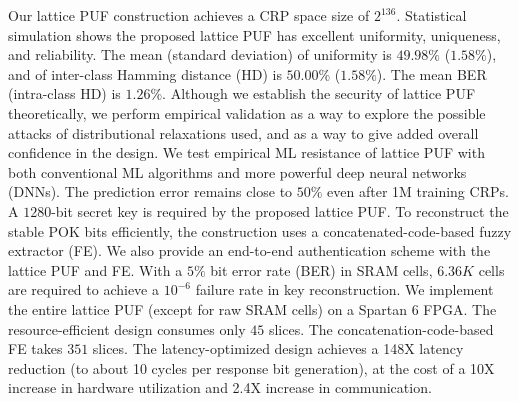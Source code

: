 Our lattice PUF construction achieves a CRP space size of $2^{136}$.
Statistical simulation shows the proposed lattice PUF has excellent uniformity, uniqueness, and reliability.
The mean (standard deviation) of uniformity is $49.98\%$ ($1.58\%$), and of inter-class Hamming distance (HD) is $50.00\%$ ($1.58\%$).
The mean BER (intra-class HD) is $1.26\%$.
Although we establish the security of lattice PUF theoretically, we perform empirical validation as a way to explore the possible attacks of distributional relaxations used, and as a way to give added overall confidence in the design. We test empirical ML resistance of lattice PUF with both conventional ML algorithms and more powerful deep neural networks (DNNs). The prediction error remains close to $50\%$ even after 1M training CRPs.
A $1280$-bit secret key is required by the proposed lattice PUF.
To reconstruct the stable POK bits efficiently, the construction uses a concatenated-code-based fuzzy extractor (FE). 
We also provide an end-to-end authentication scheme with the lattice PUF and FE.
With a $5\%$ bit error rate (BER) in SRAM cells, $6.36K$ cells are required to achieve a $10^{-6}$ failure rate in key reconstruction.
We implement the entire lattice PUF (except for raw SRAM cells) on a Spartan 6 FPGA.
The resource-efficient design consumes only $45$ slices. 
The concatenation-code-based FE takes $351$ slices. 
The latency-optimized design achieves a 148X latency reduction (to about 10 cycles per response bit generation), at the cost of a 10X increase in hardware utilization and 2.4X increase in communication.